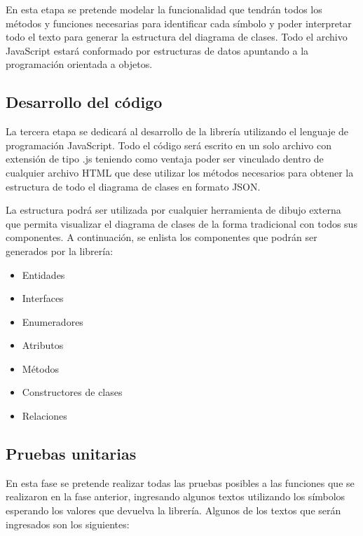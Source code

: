 \documentclass[12pt,a4paper,final]{article}
\begin{document}
	En esta etapa se pretende modelar la funcionalidad que tendrán todos los métodos y funciones necesarias para identificar cada símbolo y poder interpretar todo el texto para generar la estructura del diagrama de clases.
	Todo el archivo JavaScript estará conformado por estructuras de datos apuntando a la programación orientada a objetos.
	
	\subsection{Desarrollo del código}
	
	La tercera etapa se dedicará al desarrollo de la librería utilizando el lenguaje de programación JavaScript. Todo el código será escrito en un solo archivo con extensión de tipo .js teniendo como ventaja poder ser vinculado dentro de cualquier archivo HTML que dese utilizar los métodos necesarios para obtener la estructura de todo el diagrama de clases en formato JSON.
	
	La estructura podrá ser utilizada por cualquier herramienta de dibujo externa que permita visualizar el diagrama de clases de la forma tradicional con todos sus componentes. A continuación, se enlista los componentes que podrán ser generados por la librería:
	
	\begin{itemize}
		\item Entidades
		\item Interfaces
		\item Enumeradores
		\item Atributos
		\item Métodos
		\item Constructores de clases
		\item Relaciones
	\end{itemize}

	\subsection{Pruebas unitarias}
	En esta fase se pretende realizar todas las pruebas posibles a las funciones que se realizaron en la fase anterior, ingresando algunos textos utilizando los símbolos esperando los valores que devuelva la librería. Algunos de los textos que serán ingresados son los siguientes:
	
\end{document}
